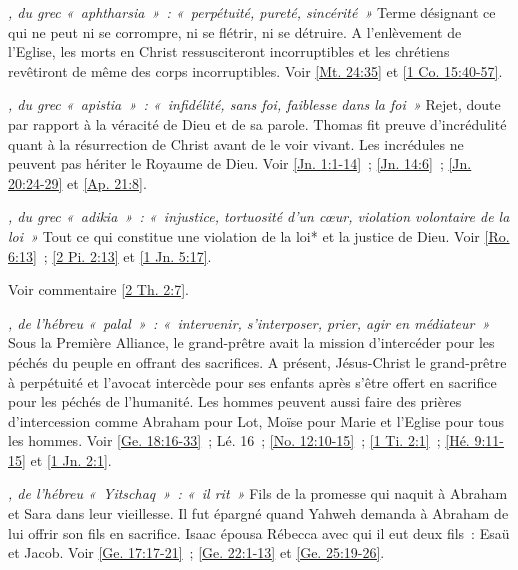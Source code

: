 \begin{multicols}{2}
\textit{, du grec «~aphtharsia~»~: «~perpétuité, pureté, sincérité~»}\newline
Terme désignant ce qui ne peut ni se corrompre, ni se flétrir, ni se détruire. A l'enlèvement de l'Eglise, les morts en Christ ressusciteront incorruptibles et les chrétiens revêtiront de même des corps incorruptibles.\newline
Voir \vref{Mt. 24:35} et \vref{1 Co. 15:40-57}.

\textit{, du grec «~apistia~»~: «~infidélité, sans foi, faiblesse dans la foi~»}\newline
Rejet, doute par rapport à la véracité de Dieu et de sa parole. Thomas fit preuve d'incrédulité quant à la résurrection de Christ avant de le voir vivant. Les incrédules ne peuvent pas hériter le Royaume de Dieu.\newline
Voir \vref{Jn. 1:1-14}~; \vref{Jn. 14:6}~; \vref{Jn. 20:24-29} et \vref{Ap. 21:8}.

\textit{, du grec «~adikia~»~: «~injustice, tortuosité d'un cœur, violation volontaire de la loi~»}\newline
Tout ce qui constitue une violation de la loi* et la justice de Dieu.\newline
Voir \vref{Ro. 6:13}~; \vref{2 Pi. 2:13} et \vref{1 Jn. 5:17}.

\textit{}\newline
Voir commentaire \vref{2 Th. 2:7}.

\textit{, de l'hébreu «~palal~»~: «~intervenir, s'interposer, prier, agir en médiateur~»}\newline
Sous la Première Alliance, le grand-prêtre avait la mission d'intercéder pour les péchés du peuple en offrant des sacrifices. A présent, Jésus-Christ le grand-prêtre à perpétuité et l'avocat intercède pour ses enfants après s'être offert en sacrifice pour les péchés de l'humanité. Les hommes peuvent aussi faire des prières d'intercession comme Abraham pour Lot, Moïse pour Marie et l'Eglise pour tous les hommes.\newline
Voir \vref{Ge. 18:16-33}~; Lé. 16~; \vref{No. 12:10-15}~; \vref{1 Ti. 2:1}~; \vref{Hé. 9:11-15} et \vref{1 Jn. 2:1}.

\textit{, de l'hébreu «~Yitschaq~»~: «~il rit~»}\newline
Fils de la promesse qui naquit à Abraham et Sara dans leur vieillesse. Il fut épargné quand Yahweh demanda à Abraham de lui offrir son fils en sacrifice. Isaac épousa Rébecca avec qui il eut deux fils~: Esaü et Jacob.\newline
Voir \vref{Ge. 17:17-21}~; \vref{Ge. 22:1-13} et \vref{Ge. 25:19-26}.


\end{multicols}
